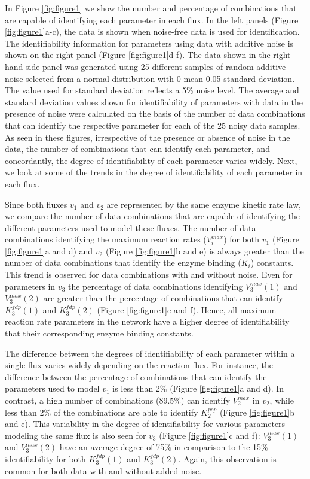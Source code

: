 \documentclass[10pt]{article}
\begin{document}
{In Figure \ref{fig:figure1} we show the number and percentage of combinations that are capable of identifying each parameter in each flux. In the left panels (Figure \ref{fig:figure1}a-c), the data is shown when noise-free data is used for identification. The identifiability information for parameters using data with additive noise is shown on the right panel (Figure \ref{fig:figure1}d-f). The data shown in the right hand side panel was generated using 25 different samples of random additive noise selected from a normal distribution with 0 mean 0.05 standard deviation. The value used for standard deviation reflects a 5\% noise level. The average and standard deviation values shown for identifiability of parameters with data in the presence of noise were calculated on the basis of the number of data combinations that can identify the respective parameter for each of the 25 noisy data samples. As seen in these figures, irrespective of the presence or absence of noise in the data, the number of combinations that can identify each parameter, and concordantly, the degree of identifiability of each parameter varies widely. Next, we look at some of the trends in the degree of identifiability of each parameter in each flux.

Since both fluxes $v_1$ and $v_2$ are represented by the same enzyme kinetic rate law, we compare the number of data combinations that are capable of identifying the different parameters used to model these fluxes. The number of data combinations identifying the maximum reaction rates ($V_i^{max}$) for both $v_1$ (Figure \ref{fig:figure1}a and d) and $v_2$ (Figure \ref{fig:figure1}b and e) is always greater than the number of data combinations that identify the enzyme binding ($K_i$) constants. This trend is observed for data combinations with and without noise. Even for parameters in $v_3$ the percentage of data combinations identifying $V_3^{max} (1)$ and $V_3^{max}(2)$ are greater than the percentage of combinations that can identify $K_3^{fdp}(1)$ and $K_3^{fdp}(2)$ (Figure \ref{fig:figure1}c and f). Hence, all maximum reaction rate parameters in the network have a higher degree of identifiability that their corresponding enzyme binding constants.

The difference between the degrees of identifiability of each parameter within a single flux varies widely depending on the reaction flux. For instance, the difference between the percentage of combinations that can identify the parameters used to model $v_1$ is less than 2\% (Figure \ref{fig:figure1}a and d). In contrast, a high number of combinations (89.5\%) can identify $V_2^{max}$ in $v_2$, while less than 2\% of the combinations are able to identify $K_2^{pep}$ (Figure \ref{fig:figure1}b and e). This variability in the degree of identifiability for various parameters modeling the same flux is also seen for $v_3$ (Figure \ref{fig:figure1}c and f): $V_3^{max} (1)$ and $V_3^{max} (2)$ have an average degree of 75\% in comparison to the 15\% identifiability for both $K_3^{fdp} (1)$ and $K_3^{fdp} (2)$. Again, this observation is common for both data with and without added noise.

}
\end{document}
